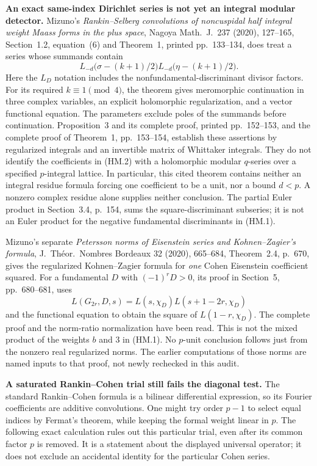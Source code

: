 \documentclass[11pt,a4paper]{article}
\theoremstyle{definition}
\renewcommand{\paragraph}[1]{\par\smallskip\noindent\textbf{#1}\quad\ignorespaces}
\begin{document}
\paragraph{An exact same-index Dirichlet series is not yet an integral
modular detector.}
Mizuno's \emph{Rankin--Selberg convolutions of noncuspidal half integral
weight Maass forms in the plus space}, Nagoya Math.\ J.\ 237 (2020),
127--165, Section~1.2, equation~(6) and Theorem~1, printed pp.~133--134,
does treat a series whose summands contain
\[
 L_{-d}\bigl(\sigma-(k+1)/2\bigr)
 L_{-d}\bigl(\eta-(k+1)/2\bigr).
 \tag{HM.2}
\]
Here the $L_D$ notation includes the nonfundamental-discriminant divisor
factors.  For its required $k\equiv1\pmod4$, the theorem gives
meromorphic continuation in three complex
variables, an explicit holomorphic regularization, and a vector functional
equation.  The parameters exclude poles of the summands before continuation.
Proposition~3 and its complete proof, printed pp.~152--153, and the
complete proof of Theorem~1, pp.~153--154, establish these assertions by
regularized integrals and an invertible matrix of Whittaker integrals.
They do not identify the coefficients in (HM.2) with a holomorphic
modular $q$-series over a specified $p$-integral lattice.  In particular,
this cited theorem contains neither an integral residue formula forcing
one coefficient to be a unit, nor a bound $d<p$.  A nonzero complex
residue alone supplies neither conclusion.  The partial Euler product
in Section~3.4, p.~154, sums the square-discriminant subseries; it is not
an Euler product for the negative fundamental discriminants in (HM.1).

Mizuno's separate \emph{Petersson norms of Eisenstein series and
Kohnen--Zagier's formula}, J.\ Th\'eor.\ Nombres Bordeaux 32 (2020), 665--684,
Theorem~2.4, p.~670, gives the regularized Kohnen--Zagier formula for
\emph{one} Cohen Eisenstein coefficient squared.  For a fundamental $D$
with $(-1)^rD>0$, its proof in Section~5, pp.~680--681, uses
\[
 L(G_{2r},D,s)=L(s,\chi_D)L(s+1-2r,\chi_D)
 \tag{HM.3}
\]
and the functional equation to obtain the square of $L(1-r,\chi_D)$.
The complete proof and the norm-ratio normalization have been read.
This is not the mixed product of the weights $b$ and $3$ in (HM.1).
No $p$-unit conclusion follows just from the nonzero real regularized
norms.  The earlier computations of those norms are named inputs to
that proof, not newly rechecked in this audit.

\paragraph{A saturated Rankin--Cohen trial still fails the diagonal test.}
The standard Rankin--Cohen formula is a bilinear differential expression,
so its Fourier coefficients are additive convolutions.  One might try
order $p-1$ to select equal indices by Fermat's theorem, while keeping
the formal weight linear in $p$.  The following exact calculation rules
out this particular trial, even after its common factor $p$ is removed.
It is a statement about the displayed universal operator; it does not
exclude an accidental identity for the particular Cohen series.
\end{document}

